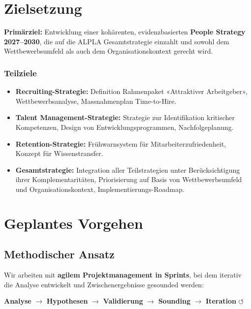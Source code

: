 \documentclass[11pt,a4paper]{article}
\begin{document}
\section{Zielsetzung}

\begin{whitebox}
\textbf{Primärziel:} Entwicklung einer kohärenten, evidenzbasierten \textbf{People Strategy 2027--2030}, die auf die ALPLA Gesamtstrategie einzahlt und sowohl dem Wettbewerbsumfeld als auch dem Organisationskontext gerecht wird.
\end{whitebox}

\subsubsection*{Teilziele}
\begin{itemize}
    \item \textbf{Recruiting-Strategie:} Definition Rahmenpaket «Attraktiver Arbeitgeber», Wettbewerbsanalyse, Massnahmenplan Time-to-Hire.
    \item \textbf{Talent Management-Strategie:} Strategie zur Identifikation kritischer Kompetenzen, Design von Entwicklungsprogrammen, Nachfolgeplanung.
    \item \textbf{Retention-Strategie:} Frühwarnsystem für Mitarbeiterzufriedenheit, Konzept für Wissenstransfer.
    \item \textbf{Gesamtstrategie:} Integration aller Teilstrategien unter Berücksichtigung ihrer Komplementaritäten, Priorisierung auf Basis von Wettbewerbsumfeld und Organisationskontext, Implementierungs-Roadmap.
\end{itemize}

\newpage

\section{Geplantes Vorgehen}

\subsection{Methodischer Ansatz}

Wir arbeiten mit \textbf{agilem Projektmanagement in Sprints}, bei dem iterativ die Analyse entwickelt und Zwischenergebnisse gesounded werden:

\begin{center}
\textbf{Analyse} $\rightarrow$ \textbf{Hypothesen} $\rightarrow$ \textbf{Validierung} $\rightarrow$ \textbf{Sounding} $\rightarrow$ \textbf{Iteration} $\circlearrowleft$
\end{center}
\end{document}
